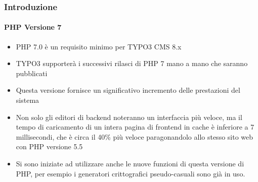 \begin{frame}[fragile]
	\frametitle{Introduzione}
	\framesubtitle{PHP Versione 7} 

	\begin{itemize}

		\item PHP 7.0 è un requisito minimo per TYPO3 CMS 8.x
		\item TYPO3 supporterà i successivi rilasci di PHP 7 mano a mano che saranno pubblicati
		\item Questa versione fornisce un significativo incremento delle prestazioni del sistema

		\item Non solo gli editori di backend noteranno un interfaccia più veloce, ma il tempo
			di caricamento di un intera pagina di frontend in cache è inferiore a
			7 millisecondi, che è circa il 40\% più veloce paragonandolo
			allo stesso sito web con PHP versione 5.5

		\item Si sono iniziate ad utilizzare anche le nuove funzioni di questa versione di PHP,
			per esempio i generatori crittografici pseudo-casuali sono già in uso.

	\end{itemize}

\end{frame}

